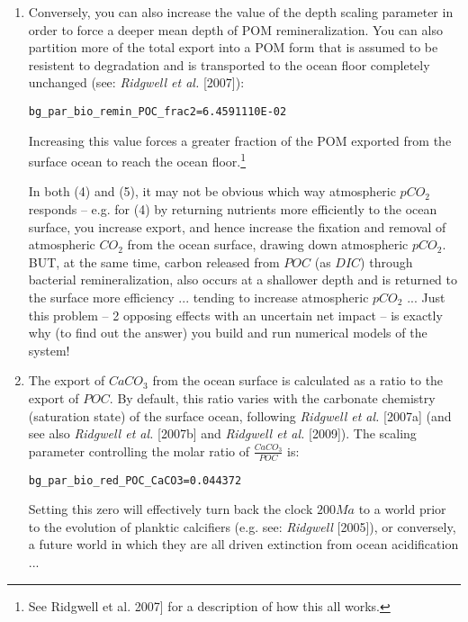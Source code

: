 \documentclass[11pt,fleqn]{book} %
\begin{document}
\begin{enumerate}[noitemsep]
\vspace{1mm}
\item Conversely, you can also increase the value of the depth scaling parameter in order to force a deeper mean depth of POM remineralization. You can also partition more of the total export into a POM form that is assumed to be resistent to degradation and is transported to the ocean floor completely unchanged (see: \textit{Ridgwell et al.} [2007]):
\vspace{-1pt}\small\begin{verbatim}
bg_par_bio_remin_POC_frac2=6.4591110E-02
\end{verbatim}\normalsize\vspace{-1pt}
Increasing this value forces a greater fraction of the POM exported from the surface ocean to reach the ocean floor.\footnote{See Ridgwell et al. 2007] for a description of how this all works.}

\vspace{1mm}
In both (4) and (5), it may not be obvious which way atmospheric \(pCO_{2}\) responds -- e.g. for (4) by returning nutrients more efficiently to the ocean surface, you increase export, and hence increase the fixation and removal of atmospheric \(CO_{2}\) from the ocean surface, drawing down atmospheric \(pCO_{2}\). BUT, at the same time, carbon released from \(POC\) (as \(DIC\)) through bacterial remineralization, also occurs at a shallower depth and is returned to the surface more efficiency ... tending to increase atmospheric \(pCO_{2}\) ... Just this problem -- 2 opposing effects with an uncertain net impact -- is exactly why (to find out the answer) you build and run numerical models of the system!

\vspace{1mm}
\item The export of \(CaCO_{3}\) from the ocean surface is calculated as a ratio to the export of \(POC\). By default, this ratio varies with the carbonate chemistry (saturation state) of the surface ocean, following \textit{Ridgwell et al.} [2007a] (and see also \textit{Ridgwell et al.} [2007b] and \textit{Ridgwell et al.} [2009]). The scaling parameter controlling the molar ratio of \(\frac{CaCO_{3}}{POC}\) is:
\vspace{-1pt}\small\begin{verbatim}
bg_par_bio_red_POC_CaCO3=0.044372
\end{verbatim}\normalsize\vspace{-1pt}
Setting this zero will effectively turn back the clock \(200Ma\) to a world prior to the evolution of planktic calcifiers (e.g. see: \textit{Ridgwell} [2005]), or conversely, a future world in which they are all driven extinction from ocean acidification ... 


\end{enumerate}
\end{document}
